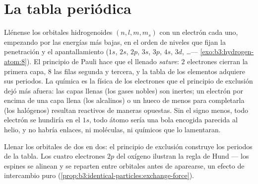 \section{La tabla periódica}

\begin{proposition}\label{prop:b3:identical-particles:periodic}
Llénense los orbitales hidrogenoides $(n, l, m, m_s)$ con un electrón
cada uno, empezando por las energías más bajas, en el orden de niveles que
fijan la penetración y el apantallamiento ($1s$, $2s$, $2p$, $3s$, $3p$,
$4s$, $3d$, \dots --- \cref{exo:b3:hydrogen-atom:8}). El principio de Pauli
hace que el llenado \emph{sature}: $2$ electrones cierran la primera capa,
$8$ las filas segunda y tercera, y la tabla de los elementos adquiere sus
periodos. La química es la física de los electrones que el principio de
exclusión dejó más afuera: las capas llenas (los gases nobles) son inertes;
un electrón por encima de una capa llena (los alcalinos) o un hueco de menos
para completarla (los halógenos) resultan reactivos de maneras opuestas. Sin
el signo menos, todo electrón se hundiría en el $1s$, todo átomo sería una
bola encogida parecida al helio, y no habría enlaces, ni moléculas, ni
químicos que lo lamentaran.
\end{proposition}
\admitted

\begin{omfigure}

{\small Llenar los orbitales de dos en dos: el principio de exclusión
construye los periodos de la tabla. Los cuatro electrones $2p$ del oxígeno
ilustran la regla de Hund --- los espines se alinean y se reparten entre
orbitales antes de aparearse, un efecto de intercambio puro
(\cref{prop:b3:identical-particles:exchange-force}).}
\end{omfigure}


